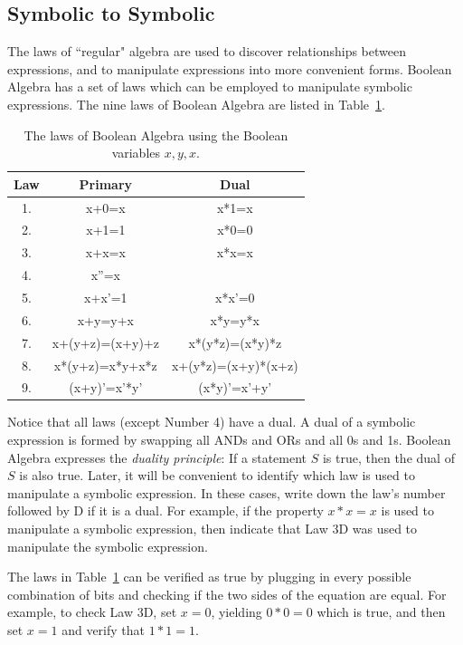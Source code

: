 \subsection{Symbolic to Symbolic}
The laws of ``regular" algebra are used to discover relationships
between expressions, and to manipulate expressions into more convenient forms.  
Boolean Algebra has a set of laws which can be employed to manipulate 
symbolic expressions.  The nine laws of Boolean Algebra are listed in 
Table~\ref{table:laws}.

\begin{table}
\begin{center}
\begin{tabular}[ht]{|c|c|c|}\hline
Law	&	Primary &	Dual	\\ \hline
1.	&	x+0=x	&	x*1=x	\\ \hline
2.	&	x+1=1	&	x*0=0	\\ \hline
3.	&	x+x=x	&	x*x=x	\\ \hline
4.	&	x''=x	&	     	\\ \hline
5.	&	x+x'=1		& x*x'=0	\\ \hline
6.	&	x+y=y+x		& x*y=y*x\\ \hline
7.	&	x+(y+z)=(x+y)+z	& x*(y*z)=(x*y)*z \\ \hline
8.	&	x*(y+z)=x*y+x*z	& x+(y*z)=(x+y)*(x+z)  \\ \hline
9.	&	(x+y)'=x'*y'  	& (x*y)'=x'+y' \\ \hline
\end{tabular}
\caption{The laws of Boolean Algebra using the Boolean variables $x,y,x$.}
\label{table:laws}
\end{center}
\end{table}

Notice that all laws (except Number 4) have a dual.  A dual of a 
symbolic expression is formed by swapping all ANDs and ORs and all 0s 
and 1s.  Boolean Algebra expresses the 
{\it duality principle}: 
If a statement $S$ is true, then the dual of $S$ is 
also true. Later, it will be convenient to identify which law is used
to manipulate a symbolic expression.  In these cases, write
down the law's number followed by D if it is a dual.  For example, if 
the property $x*x=x$ is used to manipulate a symbolic expression, then
indicate that Law 3D was used to manipulate the symbolic expression.

The laws in Table~\ref{table:laws} can be verified as true
by plugging in every possible combination of bits and checking if the two sides
of the equation are equal.  For example, to check Law 3D, set $x=0$, 
yielding $0*0=0$ which is true, and then set $x=1$ and verify that $1*1=1$.

